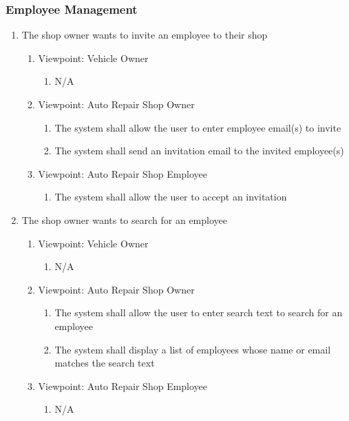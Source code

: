 \documentclass[12pt]{article}
\begin{document}
\subsubsection{Employee Management}
\begin{enumerate}[resume*=business_events]
	\item The shop owner wants to invite an employee to their shop
	      \begin{enumerate}[VP\arabic*.]
		      \item Viewpoint: Vehicle Owner
		            \begin{enumerate}
			            \item[] N/A
		            \end{enumerate}
		      \item Viewpoint: Auto Repair Shop Owner
		            \begin{enumerate}
			            \item The system shall allow the user to enter employee email(s) to invite
			            \item The system shall send an invitation email to the invited employee(s)
		            \end{enumerate}
		      \item Viewpoint: Auto Repair Shop Employee
		            \begin{enumerate}
			            \item The system shall allow the user to accept an invitation
		            \end{enumerate}
	      \end{enumerate}

	\item The shop owner wants to search for an employee
	      \begin{enumerate}[VP\arabic*.]
		      \item Viewpoint: Vehicle Owner
		            \begin{enumerate}
			            \item[] N/A
		            \end{enumerate}
		      \item Viewpoint: Auto Repair Shop Owner
		            \begin{enumerate}
			            \item The system shall allow the user to enter search text to search for an employee
			            \item The system shall display a list of employees whose name or email matches the search text
		            \end{enumerate}
		      \item Viewpoint: Auto Repair Shop Employee
		            \begin{enumerate}
			            \item[] N/A
		            \end{enumerate}
	      \end{enumerate}


\end{enumerate}
\end{document}
